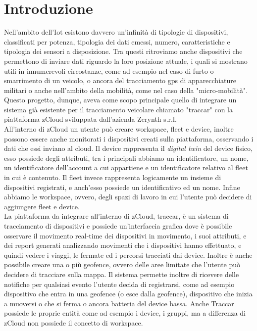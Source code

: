 \documentclass[a4paper,titlepage,12pt]{book}
\begin{document}
{\chapter{
Introduzione}
Nell'ambito dell'Iot esistono davvero un'infinità di tipologie di dispositivi, classificati per potenza, tipologia dei dati emessi, numero, caratteristiche e tipologia dei sensori a disposizione. Tra questi ritroviamo anche dispositivi che permettono di inviare dati riguardo la loro posizione attuale, i quali si mostrano utili in innumerevoli circostanze, come ad esempio nel caso di furto o smarrimento di un veicolo, o ancora del tracciamento gps di apparecchiature militari o anche nell'ambito della mobilità, come nel caso della "micro-mobilità".\\
Questo progetto, dunque, aveva come scopo principale quello di integrare un sistema già esistente per il tracciamento veicolare chiamato "traccar"  con la piattaforma zCloud sviluppata dall'azienda Zerynth s.r.l.\\
All'interno di zCloud un utente può creare workspace, fleet e device, inoltre possono essere anche monitorati i dispositivi creati sulla piattaforma, osservando i dati che essi inviano al cloud. Il device rappresenta il \textit{digital twin} del device fisico, esso possiede degli attributi, tra i principali abbiamo un identificatore, un nome, un identificatore dell'account a cui appartiene e un identificatore relativo al fleet in cui è contenuto. Il fleet invece rappresenta logicamente un insieme di dispositivi registrati, e anch'esso possiede un identificativo ed un nome. Infine abbiamo le workspace, ovvero, degli spazi di lavoro in cui l'utente può decidere di aggiungere fleet e device.\\
La piattaforma da integrare all'interno di zCloud, traccar, è un sistema di tracciamento di dispositivi e possiede un'interfaccia grafica dove è possibile osservare il movimento real-time dei dispositivi in movimento, i suoi attributi, e dei report generati analizzando movimenti che i dispositivi hanno effettuato, e quindi vedere i viaggi, le fermate ed i percorsi tracciati dai device. Inoltre è anche possibile creare una o più geofence, ovvero delle aree limitate che l'utente può decidere di tracciare sulla mappa. Il sistema permette inoltre di ricevere delle notifiche per qualsiasi evento l'utente decida di registrarsi, come ad esempio dispositivo che entra in una geofence (o esce dalla geofence), dispositivo che inizia a muoversi o che si ferma o ancora batteria del device bassa. Anche Traccar possiede le proprie entità come ad esempio i device, i gruppi, ma a differenza di zCloud non possiede il concetto di workspace.\\
}
\end{document}
